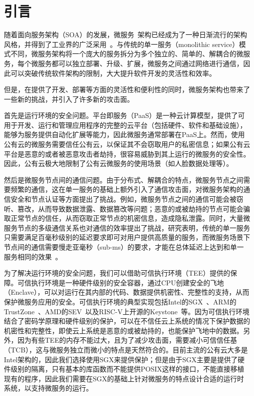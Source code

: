 \section{引言}\label{sec:introduction}
随着面向服务架构（SOA）的发展，微服务~\cite{}架构已经成为了一种日渐流行的架构风格，并得到了工业界的广泛采用~\cite{}。与传统的单一服务（monolithic service）模式不同，微服务架构将一个庞大的服务拆分为多个独立的、简单的、解耦合的微服务，每个微服务都可以独立部署、升级、扩展，微服务之间通过网络进行通信，因此可以突破传统软件架构的限制，大大提升软件开发的灵活性和效率。


但是，在提供了开发、部署等方面的灵活性和便利性的同时，微服务架构也带来了一些新的挑战，并引入了许多新的攻击面。

首先是运行环境的安全问题。平台即服务（PaaS）是一种云计算模型，提供了可用于开发、运行和管理应用程序的完整的云平台（包括硬件、软件和基础设施），能够为服务提供自动化扩展等能力，因此微服务通常部署在PaaS上。然而，使用公有云的微服务需要信任公有云，以保证其不会窃取用户的私密信息；如果公有云平台是恶意的或者被恶意攻击者劫持，很容易威胁到其上运行的微服务的安全性。因此，公有云极大地限制了公有云微服务的使用场景（如人脸数据处理等）。

然后是微服务节点间的通信问题。由于分布式、解耦合的特点，微服务节点之间需要频繁的通信，这在单一服务的基础上额外引入了通信攻击面，对微服务架构的通信安全和节点认证等方面提出了挑战。例如，微服务节点之间的通信可能会被窃听、篡改，从而导致数据泄露、数据篡改等问题；恶意的或被劫持的节点可能会骗取正常节点的信任，从而窃取正常节点的机密信息，造成隐私泄露。同时，大量微服务节点的多级通信关系也对通信的效率提出了挑战，研究表明，传统的单一服务只需要满足百毫秒级别的延迟要求即可对用户提供高质量的服务，而微服务场景下节点间的通信需要慢走亚毫秒（sub-ms）的要求，才能在总体延迟上达到和单一服务相同的效果~\cite{}。

为了解决运行环境的安全问题，我们可以借助可信执行环境（TEE）提供的保障。可信执行环境是一种硬件级别的安全容器，通过CPU创建安全的飞地（Enclave），可以对运行在其内部的代码、数据提供机密性、完整性的支持，从而保护微服务应用的安全。可信执行环境的典型实现包括Intel的SGX~\cite{}、ARM的TrustZone~\cite{}、AMD的SEV~\cite{}以及RISC-V上开源的Keystone~\cite{}等。因为可信执行环境结合了密码学原理和硬件级别的保护，可以在不信任云上系统的情况下保护数据的机密性和完整性，即使云上系统是恶意的或被劫持的，也能保护飞地中的数据。另外，因为有些TEE的内存不能过大，且为了减少攻击面，需要减小可信信任基（TCB），这与微服务独立而微小的特点是天然符合的。目前主流的公有云大多是Intel架构的，因此我们选择使用SGX来提供保护；但是由于SGX主要是提供了硬件级别的隔离，只有基本的库函数而不能提供POSIX这样的接口，不能直接移植现有的程序，因此我们需要在SGX的基础上针对微服务的特点设计合适的运行时系统，以支持微服务的运行。

